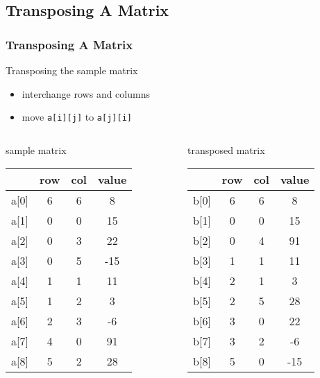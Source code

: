\documentclass[newPxFont,sthlmFooter,nooffset]{beamer}
\begin{document}
\subsection{Transposing A Matrix}

\begin{frame}
  \frametitle{Transposing A Matrix}
Transposing the sample matrix
\begin{itemize}
\item interchange rows and columns
\item move \texttt{a[i][j]} to \texttt{a[j][i]}
\end{itemize}


\begin{columns}
  \begin{column}{0.5\textwidth}
sample matrix
    \begin{tabular}{r c c c}
      & row & col & value \\ \hline
      a[0]&  6  &  6  &   8   \\
      a[1]&  0  &  0  &  15   \\ 
      a[2]&  0  &  3  &  22   \\ 
      a[3]&  0  &  5  & -15   \\ 
      a[4]&  1  &  1  &  11   \\ 
      a[5]&  1  &  2  &   3   \\ 
      a[6]&  2  &  3  &  -6   \\ 
      a[7]&  4  &  0  &  91   \\ 
      a[8]&  5  &  2  &  28   \\ 
    \end{tabular}
   
  \end{column}
  \begin{column}{0.5\textwidth}
transposed matrix
    \begin{tabular}{r c c c}
      & row & col & value \\ \hline
      b[0]&  6  &  6  &   8   \\
      b[1]&  0  &  0  &  15   \\ 
      b[2]&  0  &  4  &  91   \\ 
      b[3]&  1  &  1  &  11   \\ 
      b[4]&  2  &  1  &   3   \\ 
      b[5]&  2  &  5  &  28   \\ 
      b[6]&  3  &  0  &  22   \\ 
      b[7]&  3  &  2  &  -6   \\ 
      b[8]&  5  &  0  &  -15   \\ 
    \end{tabular}  
  \end{column}
\end{columns}
  

\end{frame}
\end{document}
